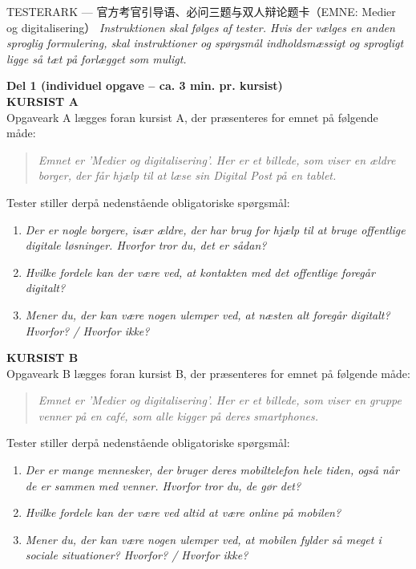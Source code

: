 \begin{emailbox}{TESTERARK --- 官方考官引导语、必问三题与双人辩论题卡（EMNE: Medier og digitalisering）}
\small\textcolor{NCDGray}{\textit{Instruktionen skal følges af tester. Hvis der vælges en anden sproglig formulering, skal instruktioner og spørgsmål indholdsmæssigt og sprogligt ligge så tæt på forlægget som muligt.}}

\vspace{0.35em}
\textbf{\color{NCDRed}Del 1 (individuel opgave -- ca. 3 min. pr. kursist)}\\
\textbf{\color{NCDNavy}KURSIST A}\\
Opgaveark A lægges foran kursist A, der præsenteres for emnet på følgende måde:
\begin{quote}
\textit{Emnet er 'Medier og digitalisering'. Her er et billede, som viser en ældre borger, der får hjælp til at læse sin Digital Post på en tablet.}
\end{quote}
Tester stiller derpå nedenstående obligatoriske spørgsmål:
\begin{enumerate}
  \item \textit{Der er nogle borgere, især ældre, der har brug for hjælp til at bruge offentlige digitale løsninger. Hvorfor tror du, det er sådan?}
  \item \textit{Hvilke fordele kan der være ved, at kontakten med det offentlige foregår digitalt?}
  \item \textit{Mener du, der kan være nogen ulemper ved, at næsten alt foregår digitalt? Hvorfor? / Hvorfor ikke?}
\end{enumerate}

\textbf{\color{NCDNavy}KURSIST B}\\
Opgaveark B lægges foran kursist B, der præsenteres for emnet på følgende måde:
\begin{quote}
\textit{Emnet er 'Medier og digitalisering'. Her er et billede, som viser en gruppe venner på en café, som alle kigger på deres smartphones.}
\end{quote}
Tester stiller derpå nedenstående obligatoriske spørgsmål:
\begin{enumerate}
  \item \textit{Der er mange mennesker, der bruger deres mobiltelefon hele tiden, også når de er sammen med venner. Hvorfor tror du, de gør det?}
  \item \textit{Hvilke fordele kan der være ved altid at være online på mobilen?}
  \item \textit{Mener du, der kan være nogen ulemper ved, at mobilen fylder så meget i sociale situationer? Hvorfor? / Hvorfor ikke?}
\end{enumerate}


\end{emailbox}
